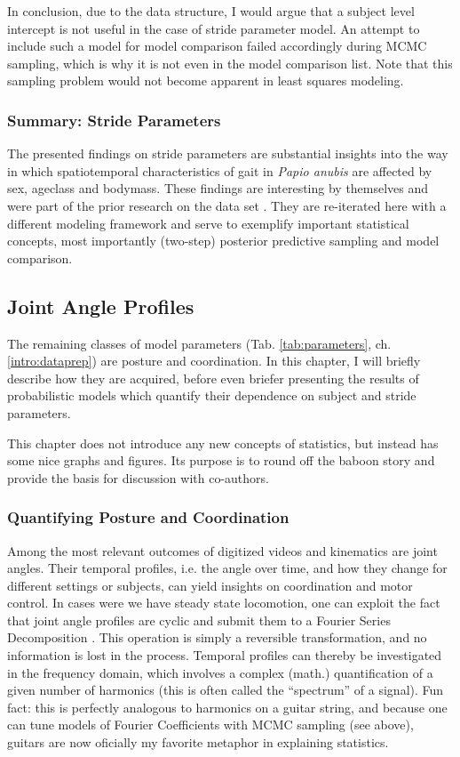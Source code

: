 In conclusion, due to the data structure, I would argue that a subject level intercept is not useful in the case of stride parameter model.
An attempt to include such a model for model comparison failed accordingly during MCMC sampling, which is why it is not even in the model comparison list.
Note that this sampling problem would not become apparent in least squares modeling.


\subsubsection{Summary: Stride Parameters}
\label{sec:org0d94e4f}
The presented findings on stride parameters are substantial insights into the way in which spatiotemporal characteristics of gait in \emph{Papio anubis} are affected by sex, ageclass and bodymass.
These findings are interesting by themselves and were part of the prior research on the data set \citep[][]{Druelle2021}.
They are re-iterated here with a different modeling framework and serve to exemplify important statistical concepts, most importantly (two-step) posterior predictive sampling and model comparison.

\clearpage
\subsection{Joint Angle Profiles}
\label{sec:orgc82aa48}
The remaining classes of model parameters (Tab. \ref{tab:parameters}, ch. \ref{intro:dataprep}) are posture and coordination.
In this chapter, I will briefly describe how they are acquired, before even briefer presenting the results of probabilistic models which quantify their dependence on subject and stride parameters.


This chapter does not introduce any new concepts of statistics, but instead has some nice graphs and figures.
Its purpose is to round off the baboon story and provide the basis for discussion with co-authors.


\subsubsection{Quantifying Posture and Coordination}
\label{sec:orgb18a99b}
Among the most relevant outcomes of digitized videos and kinematics are joint angles.
Their temporal profiles, i.e. the angle over time, and how they change for different settings or subjects, can yield insights on coordination and motor control.
In cases were we have steady state locomotion, one can exploit the fact that joint angle profiles are cyclic and submit them to a Fourier Series Decomposition \citep[\emph{cf.}][]{Mielke2019}.
This operation is simply a reversible transformation, and no information is lost in the process.
Temporal profiles can thereby be investigated in the frequency domain, which involves a complex (math.) quantification of a given number of harmonics (this is often called the ``spectrum'' of a signal).
Fun fact: this is perfectly analogous to harmonics on a guitar string, and because one can tune models of Fourier Coefficients with MCMC sampling (see above), guitars are now oficially my favorite metaphor in explaining statistics.

